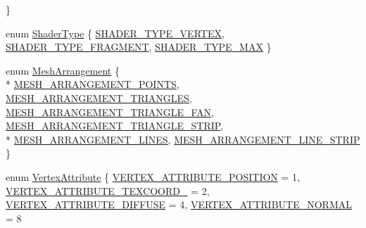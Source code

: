 \begin{DoxyCompactItemize}
 \}
\item 
enum \hyperlink{namespacekglt_abeac81175ad2fbd1c3912235ab3b1d56}{Shader\-Type} \{ \hyperlink{namespacekglt_abeac81175ad2fbd1c3912235ab3b1d56a352595130f867432921116909aa93b69}{S\-H\-A\-D\-E\-R\-\_\-\-T\-Y\-P\-E\-\_\-\-V\-E\-R\-T\-E\-X}, 
\hyperlink{namespacekglt_abeac81175ad2fbd1c3912235ab3b1d56a4140a263ae0f7ccf977d94d7edf7673d}{S\-H\-A\-D\-E\-R\-\_\-\-T\-Y\-P\-E\-\_\-\-F\-R\-A\-G\-M\-E\-N\-T}, 
\hyperlink{namespacekglt_abeac81175ad2fbd1c3912235ab3b1d56a29d2c0e52dfb94f5898893519dfdcc6b}{S\-H\-A\-D\-E\-R\-\_\-\-T\-Y\-P\-E\-\_\-\-M\-A\-X}
 \}
\item 
enum \hyperlink{namespacekglt_a4d5a692708f38d0176dd6f5d341289da}{Mesh\-Arrangement} \{ \\*
\hyperlink{namespacekglt_a4d5a692708f38d0176dd6f5d341289daa6bb5bcc4734331b84ac1b80da8fc199d}{M\-E\-S\-H\-\_\-\-A\-R\-R\-A\-N\-G\-E\-M\-E\-N\-T\-\_\-\-P\-O\-I\-N\-T\-S}, 
\hyperlink{namespacekglt_a4d5a692708f38d0176dd6f5d341289daa10bc529bd0233d4686437519a810138d}{M\-E\-S\-H\-\_\-\-A\-R\-R\-A\-N\-G\-E\-M\-E\-N\-T\-\_\-\-T\-R\-I\-A\-N\-G\-L\-E\-S}, 
\hyperlink{namespacekglt_a4d5a692708f38d0176dd6f5d341289daa2195d40035ca33b61b6a06382f5261e5}{M\-E\-S\-H\-\_\-\-A\-R\-R\-A\-N\-G\-E\-M\-E\-N\-T\-\_\-\-T\-R\-I\-A\-N\-G\-L\-E\-\_\-\-F\-A\-N}, 
\hyperlink{namespacekglt_a4d5a692708f38d0176dd6f5d341289daa45548cbe35f9b21b3e38434acfd75880}{M\-E\-S\-H\-\_\-\-A\-R\-R\-A\-N\-G\-E\-M\-E\-N\-T\-\_\-\-T\-R\-I\-A\-N\-G\-L\-E\-\_\-\-S\-T\-R\-I\-P}, 
\\*
\hyperlink{namespacekglt_a4d5a692708f38d0176dd6f5d341289daa71e2bf54d4a979ea0241dfbdba384fbe}{M\-E\-S\-H\-\_\-\-A\-R\-R\-A\-N\-G\-E\-M\-E\-N\-T\-\_\-\-L\-I\-N\-E\-S}, 
\hyperlink{namespacekglt_a4d5a692708f38d0176dd6f5d341289daacfbb919338f6b70f7aa60c319d527d6a}{M\-E\-S\-H\-\_\-\-A\-R\-R\-A\-N\-G\-E\-M\-E\-N\-T\-\_\-\-L\-I\-N\-E\-\_\-\-S\-T\-R\-I\-P}
 \}
\item 
enum \hyperlink{namespacekglt_a7011dc1de2842074684fe7c225a12941}{Vertex\-Attribute} \{ \hyperlink{namespacekglt_a7011dc1de2842074684fe7c225a12941a8f23813f07620d5999d6825f5b199055}{V\-E\-R\-T\-E\-X\-\_\-\-A\-T\-T\-R\-I\-B\-U\-T\-E\-\_\-\-P\-O\-S\-I\-T\-I\-O\-N} =  1, 
\hyperlink{namespacekglt_a7011dc1de2842074684fe7c225a12941ae8935b2a8cdba2ad7c7354c25f311772}{V\-E\-R\-T\-E\-X\-\_\-\-A\-T\-T\-R\-I\-B\-U\-T\-E\-\_\-\-T\-E\-X\-C\-O\-O\-R\-D\-\_} =  2, 
\hyperlink{namespacekglt_a7011dc1de2842074684fe7c225a12941a5f53fc942e72e7a64cf174b81a8bc3a6}{V\-E\-R\-T\-E\-X\-\_\-\-A\-T\-T\-R\-I\-B\-U\-T\-E\-\_\-\-D\-I\-F\-F\-U\-S\-E} =  4, 
\hyperlink{namespacekglt_a7011dc1de2842074684fe7c225a12941a6677b8e1745cdab6b4c15d65f2590b43}{V\-E\-R\-T\-E\-X\-\_\-\-A\-T\-T\-R\-I\-B\-U\-T\-E\-\_\-\-N\-O\-R\-M\-A\-L} =  8

\end{DoxyCompactItemize}
